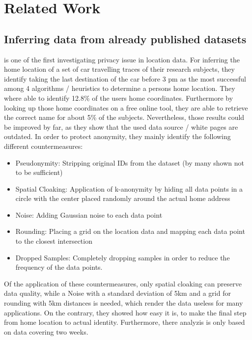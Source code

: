 \chapter{Related Work}\label{chapter:related-work}
\section{Inferring data from already published datasets}

\parencite{krumm} is one of the first investigating privacy issue in location data. For inferring the home location of a set of car travelling traces of their research subjects, they identify taking the last destination of the car before 3 pm as the most successful among 4 algorithms / heuristics to determine a persons home location. They where able to identify 12.8\% of the users home coordinates. Furthermore by looking up those home coordinates on a free online tool, they are able to retrieve the correct name for about 5\% of the subjects. Nevertheless, those results could be improved by far, as they show that the used data source / white pages are outdated.
In order to protect anonymity, they mainly identify the following different countermeasures:
\begin{itemize}
	\item Pseudonymity: Stripping original IDs from the dataset (by many shown not to be sufficient)
	\item Spatial Cloaking: Application of k-anonymity by hiding all data points in a circle with the center placed randomly around the actual home address
	\item Noise: Adding Gaussian noise to each data point
	\item Rounding: Placing a grid on the location data and mapping each data point to the closest intersection
	\item Dropped Samples: Completely dropping samples in order to reduce the frequency of the data points.
\end{itemize}
Of the application of these countermeasures, only spatial cloaking can preserve data quality, while a Noise with a standard deviation of 5km and a grid for rounding with 5km distances is needed, which render the data useless for many applications.
On the contrary, they showed how easy it is, to make the final step from home location to actual identity. Furthermore, there analyzis is only based on data covering two weeks.


